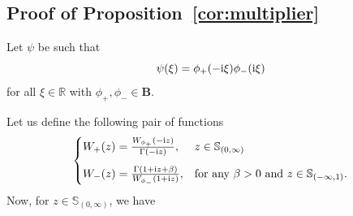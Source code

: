 \documentclass[12pt]{amsart}
\newcommand{\hlabel}{\phantomsection\label}
\numberwithin{equation}{section}
\newcommand{\bb}{\mathbb}
\newcommand{\cc}{\mathcal}
\renewcommand{\le}{\leqslant}
\newcommand{\B}{\mathbf{B}}
\theoremstyle{definition}
\theoremstyle{assump}
\theoremstyle{remark}
\begin{document}
\subsection{Proof of Proposition~\ref{cor:multiplier}} Let $\psi$ be such that $$\psi(\xi)=\phi_+(-\rm i\xi)\phi_-(\rm i\xi)$$ for all $\xi\in\bb{R}$ with $\phi_+,\phi_-\in\B$.

Let us define the following pair of functions
\begin{align*}
\begin{cases}
W_+(z)=\frac{W_{\phi_+}(-{\rm i} z)}{\Gamma({-\rm i}z)}, &  z\in\bb{S}_{(0,\infty)} \vspace{.3 cm} \\
W_-(z)=\frac{\Gamma(1+{\rm i}z+\beta)}{W_{\phi_-}(1+{\rm i}z)}, &  \mbox{for any $\beta>0$ and $z\in\bb{S}_{(-\infty,1)}$}.
\end{cases}
\end{align*}
Now, for $z\in\bb{S}_{(0,\infty)}$, we have
\end{document}
